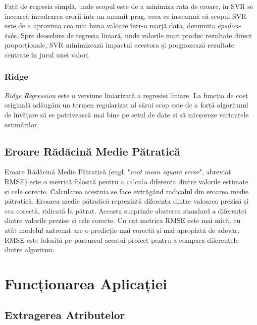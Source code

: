 \documentclass{article}
\begin{document}
Față de regresia simplă, unde scopul este de a minimiza rata de eroare, în SVR se încearcă încadrarea erorii intr-un anumit prag, ceea ce inseamnă că scopul SVR este de a aproxima cea mai buna valoare într-o marjă data, denumita \textit{epsilon-tube}. Spre deosebire de regresia liniară, unde valorile mari produc rezultate direct proporționale, SVR minimizează impactul acestora și prognozează rezultate centrate în jurul unei valori.

\subsubsection{Ridge}

\textit{Ridge Regression} este o versiune liniarizată a regresiei liniare. La funcția de cost originală adăugăm un termen regularizat al cărui scop este de a forță algoritmul de învățare să se potrivească mai bine pe setul de date și să micșoreze varianțele estimărilor.

\subsection{Eroare Rădăcină Medie Pătratică}

Eroare Rădăcină Medie Pătratică (engl. "\textit{root mean square error}", abreviat RMSE) este o metrică folosită pentru a calcula diferența dintre valorile estimate și cele corecte. Calcularea acestuia se face extrăgând radicalul din eroarea medie pătratică. Eroarea medie pătratică reprezintă diferența dintre valoarea prezisă și cea corectă, ridicată la pătrat. Aceasta surprinde abaterea standard a diferenței dintre valorile prezise și cele corecte. Cu cat metrica RMSE este mai mică, cu atât modelul antrenat are o predicție mai corectă și mai apropiată de adevăr. RMSE este folosită pe parcursul acestui proiect pentru a compara diferențele dintre algoritmi.

\section{Funcționarea Aplicației}

\subsection{Extragerea Atributelor}
\end{document}
